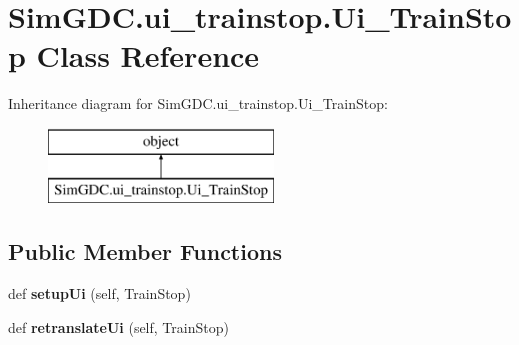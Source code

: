 \hypertarget{class_sim_g_d_c_1_1ui__trainstop_1_1_ui___train_stop}{}\section{Sim\+G\+D\+C.\+ui\+\_\+trainstop.\+Ui\+\_\+\+Train\+Stop Class Reference}
\label{class_sim_g_d_c_1_1ui__trainstop_1_1_ui___train_stop}
Inheritance diagram for Sim\+G\+D\+C.\+ui\+\_\+trainstop.\+Ui\+\_\+\+Train\+Stop\+:\begin{figure}[H]
\begin{center}
\leavevmode
\includegraphics[height=2.000000cm]{class_sim_g_d_c_1_1ui__trainstop_1_1_ui___train_stop}
\end{center}
\end{figure}
\subsection*{Public Member Functions}
\begin{DoxyCompactItemize}
\item 
\hypertarget{class_sim_g_d_c_1_1ui__trainstop_1_1_ui___train_stop_a655a957585643809fa986721970c62d6}{}def {\bfseries setup\+Ui} (self, Train\+Stop)\label{class_sim_g_d_c_1_1ui__trainstop_1_1_ui___train_stop_a655a957585643809fa986721970c62d6}

\item 
\hypertarget{class_sim_g_d_c_1_1ui__trainstop_1_1_ui___train_stop_a71cfc605841a3aebc7ef39869fe2edd9}{}def {\bfseries retranslate\+Ui} (self, Train\+Stop)\label{class_sim_g_d_c_1_1ui__trainstop_1_1_ui___train_stop_a71cfc605841a3aebc7ef39869fe2edd9}

\end{DoxyCompactItemize}
